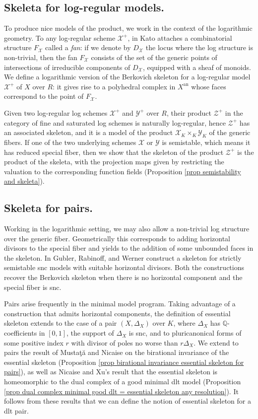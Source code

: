 \documentclass{amsart}%
\numberwithin{equation}{subsection}
\theoremstyle{plain2}
\theoremstyle{definition2}
\theoremstyle{stepstyle}
\theoremstyle{point}
\theoremstyle{subpoint}
\newcommand{\cX}{\ensuremath{\mathscr{X}}}
\newcommand{\cY}{\ensuremath{\mathscr{Y}}}
\newcommand{\cZ}{\ensuremath{\mathscr{Z}}}
\renewcommand{\cY}{\ensuremath{\mathscr{Y}}}
\newcommand{\an}{\mathrm{an}}
\begin{document}
\subsection{Skeleta for log-regular models.} To produce nice models of the product, we work in the context of the logarithmic geometry. To any log-regular scheme $\cX^+$, in \cite{Kato1994a} Kato attaches a combinatorial structure $F_\cX$ called a \emph{fan}: if we denote by $D_\cX$ the locus where the log structure is non-trivial, then the fan $F_\cX$ consists of the set of the generic points of intersections of irreducible components of $D_\cX$, equipped with a sheaf of monoids. We define a logarithmic version of the Berkovich skeleton for a log-regular model $\cX^+$ of $X$ over $R$: it gives rise to a polyhedral complex in $X^\an$ whose faces correspond to the point of $F_\cX$.

Given two log-regular log schemes $\cX^+$ and $\cY^+$ over $R$, their product $\cZ^+$ in the category of fine and saturated log schemes is naturally log-regular, hence $\cZ^+$ has an associated skeleton, and it is a model of the product $\cX_K \times_K \cY_K$ of the generic fibers. If one of the two underlying schemes $\cX$ or $\cY$ is semistable, which means it has reduced special fiber, then we show that the skeleton of the product $\cZ^+$ is the product of the skeleta, with the projection maps given by restricting the valuation to the corresponding function fields (Proposition \ref{prop semistability and skeleta}).

\subsection{Skeleta for pairs.} Working in the logarithmic setting, we may also allow a non-trivial log structure over the generic fiber. Geometrically this corresponds to adding horizontal divisors to the special fiber and yields to the addition of some unbounded faces in the skeleton. In \cite{GublerRabinoffWerner} Gubler, Rabinoff, and Werner construct a skeleton for strictly semistable snc models with suitable horizontal divisors. Both the constructions recover the Berkovich skeleton when there is no horizontal component and the special fiber is snc.

Pairs arise frequently in the minimal model program. Taking advantage of a construction that admits horizontal components, the definition of essential skeleton extends to the case of a pair $(X,\Delta_X)$ over $K$, where $\Delta_X$ has $\mathbb{Q}$-coefficients in $[0,1]$, the support of $\Delta_X$ is snc, and to pluricanonical forms of some positive index $r$ with divisor of poles no worse than $r\Delta_X$. We extend to pairs the result of Musta{\c{t}}{\u{a}} and Nicaise \cite{MustataNicaise} on the birational invariance of the essential skeleton (Proposition \ref{prop birational invariance essential skeleton for pairs}), as well as Nicaise and Xu's result \cite{NicaiseXu} that the essential skeleton is homeomorphic to the dual complex of a good minimal dlt model (Proposition \ref{prop dual complex minimal good dlt = essential skeleton any resolution}). It follows from these results that we can define the notion of essential skeleton for a dlt pair.
\end{document}

